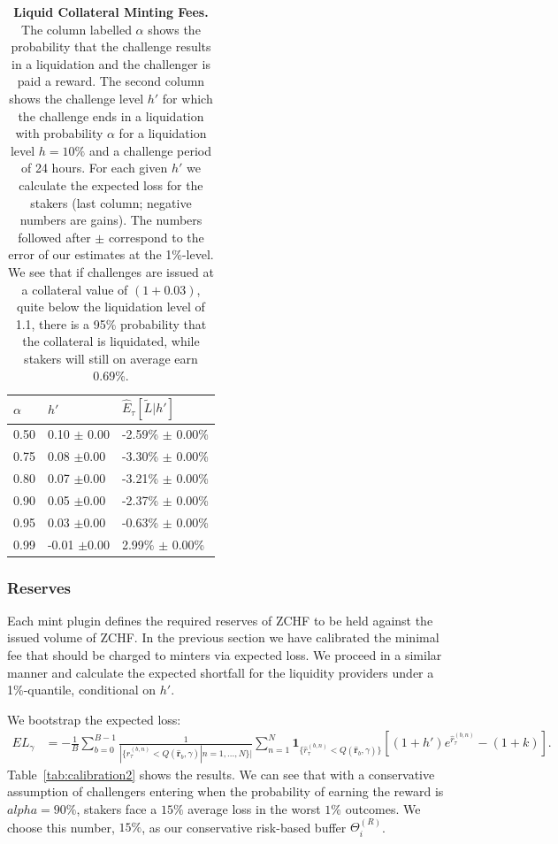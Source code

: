 \documentclass[english,11pt]{article}
\begin{document}
\begin{table}[h]
\caption{\textbf{Liquid Collateral Minting Fees.} The column labelled $\alpha$ shows the probability
that the challenge results in a liquidation and the challenger is paid a reward.
The second column shows the challenge level $h'$ for which the challenge ends in a
liquidation with probability $\alpha$ for a liquidation level $h=10\%$ and a challenge
period of 24 hours. For each given $h'$ we calculate the expected loss for the stakers
(last column; negative numbers are gains).
The numbers followed after $\pm$ correspond to the error of our estimates at the 1\%-level.
We see that if challenges are issued at a collateral value of $(1+0.03)$, quite below the 
liquidation level of 1.1, there is
a 95\% probability that the collateral is liquidated, while stakers will still on average
earn 0.69\%.\label{tab:calibration}}
\center
\begin{tabular}{lll}
\toprule
\textbf{$\alpha$} & \textbf{$h'$}   & \textbf{$\hat{E}_{\tau}\left[\tilde{L} | h' \right]$}\\
\midrule
0.50                           & 0.10 $\pm$ 0.00 & -2.59\% $\pm$ 0.00\% \\
0.75                           & 0.08 $\pm$0.00  & -3.30\% $\pm$ 0.00\% \\
0.80                           & 0.07 $\pm$0.00  & -3.21\% $\pm$ 0.00\% \\
0.90                           & 0.05 $\pm$0.00  & -2.37\% $\pm$ 0.00\% \\
0.95                           & 0.03 $\pm$0.00  & -0.63\% $\pm$ 0.00\% \\
0.99                           & -0.01 $\pm$0.00 & 2.99\% $\pm$ 0.00\% \\
\bottomrule
\end{tabular}
\end{table}

\clearpage
\subsubsection{Reserves}
Each mint plugin defines the required reserves of ZCHF to be held against
the issued volume of ZCHF. In the previous section we have calibrated
the minimal fee that should be charged to minters via expected loss.
We proceed in a similar manner and calculate the expected shortfall
for the liquidity providers under a 1\%-quantile, conditional on $h'$.

We bootstrap the expected loss:
\begin{align}
EL_{\gamma} &= - \frac{1}{B} \sum_{b=0}^{B-1} \frac{1}{|\{ \hat{r}_{\tau}^{(b,n)} < Q(\mathbf{\hat{r}}_b, \gamma) | n=1,...,N \}|} \sum_{n=1}^N 
	\mathbf{1}_{\{ \hat{r}_{\tau}^{(b,n)} < Q(\mathbf{\hat{r}}_b, \gamma) \}} 
	\left[(1 + h') e^{\hat{r}_{\tau}^{(b,n)}} - (1+k)\right].
\end{align}
Table~\ref{tab:calibration2} shows the results. We can see that with a conservative assumption of 
challengers entering when the probability of earning the reward is $alpha=90\%$, stakers
face a $15\%$ average loss in the worst $1\%$ outcomes. We choose this number, $15\%$, as our conservative risk-based
buffer $\Theta_i^{(R)}$.
\end{document}

